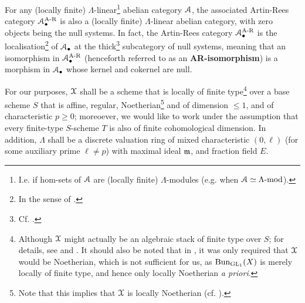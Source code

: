                 \begin{proposition} \label{prop: artin_rees_categories_are_linear_and_abelian}
                    \cite[Expos\'e V, Propositions 2.2.2 et 2.4.1]{sga5} For any (locally finite) $\Lambda$-linear\footnote{I.e. if hom-sets of $\mathcal{A}$ are (locally finite) $\Lambda$-modules (e.g. when $\mathcal{A} \simeq \Lambda\text{-}\mathrm{mod}$).} abelian category $\mathcal{A}$, the associated Artin-Rees category $\mathcal{A}_{\bullet}^{\mathrm{A\text{-}R}}$ is also a (locally finite) $\Lambda$-linear abelian category, with zero objects being the null systems. In fact, the Artin-Rees category $\mathcal{A}_{\bullet}^{\mathrm{A\text{-}R}}$ is the localisation\footnote{In the sense of \cite[\href{https://stacks.math.columbia.edu/tag/02MS}{Tag 02MS}]{stacks}.} of $\mathcal{A}_{\bullet}$ at the thick\footnote{Cf. \cite[\href{https://stacks.math.columbia.edu/tag/02MO}{Tag 02MO}]{stacks}.} subcategory of null systems, meaning that an isomorphism in $\mathcal{A}_{\bullet}^{\mathrm{A\text{-}R}}$ (henceforth referred to as an \textbf{AR-isomorphism}) is a morphism in $\mathcal{A}_{\bullet}$ whose kernel and cokernel are null. 
                \end{proposition}
                
                \begin{convention} \label{conv: l_adic_sheaves_conventions}
                    For our purposes, $\mathcal{X}$ shall be a scheme that is locally of finite type\footnote{Although $\mathcal{X}$ might actually be an algebraic stack of finite type over $S$; for details, see \cite{laszlo_olsson_adic_sheaves_on_artin_stacks_1} and \cite{laszlo_olsson_adic_sheaves_on_artin_stacks_2}. It should also be noted that in \cite[Subsection 1.4]{conrad_etale_cohomology}, it was only required that $\mathcal{X}$ would be Noetherian, which is not sufficient for us, as $\mathrm{Bun}_{\mathrm{GL}_1}(X)$ is merely locally of finite type, and hence only locally Noetherian \textit{a priori}.} over a base scheme $S$ that is affine, regular, Noetherian\footnote{Note that this implies that $\mathcal{X}$ is locally Noetherian (cf. \cite[\href{https://stacks.math.columbia.edu/tag/01T6}{Tag 01T6}]{stacks}).} and of dimension $\leq 1$, and of characteristic $p \geq 0$; moreoever, we would like to work under the assumption that every finite-type $S$-scheme $T$ is also of finite cohomological dimension. In addition, $\Lambda$ shall be a discrete valuation ring of mixed characteristic $(0, \ell)$ (for some auxiliary prime $\ell \not = p$) with maximal ideal $\mathfrak{m}$, and fraction field $E$.
                \end{convention}
                
